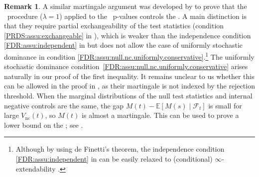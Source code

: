 \documentclass[a4paper,11pt]{article}
\theoremstyle{plain}
\theoremstyle{definition}
\newtheorem{remark}{Remark}
\def\EE{\mathbb{E}}
\def\calF{\mathcal{F}}
\theoremstyle{plain}
\newcommand{\No}{{n}}
\newcommand{\NoNc}{m}
\newcommand{\nickname}{{\text{RANC}}}
\newcommand{\ncFalsePositive}{{V_{\text{nc}}}}
\newcommand{\FDR}{\text{FDR}}
\newcommand{\BH}{{\text{BH}}}
\newcommand{\stoppingTime}{{\tau_q}}
\newcommand{\stoppingTimeSecond}{{\tau_{q,2}}}
\begin{document}
\begin{remark}
  A similar martingale argument was developed by
  \textcite{mary22_semi_super_multip_testin} to prove that the
  \BH~procedure ($\lambda = 1$) applied to the \nickname~p-values
  controls the \FDR. A main distinction is that they
  require partial exchangeability of the test statistics (condition
  \ref{PRDS:assu:exchangeable} in ), which is weaker
  than the independence condition \ref{FDR:assu:independent} in
   but does not allow
  the case of uniformly stochastic
  dominance in condition
  \ref{FDR:assu:null.nc.uniformly.conservative}.\footnote{Although by
    using de Finetti's theorem, the
    independence condition \ref{FDR:assu:independent} in
     can be easily relaxed to (conditional)
    $\infty$-extendability \parencite{diaconis1980finite}.}
  The uniformly stochastic dominance
  condition~\ref{FDR:assu:null.nc.uniformly.conservative} arises
  naturally in our proof of the first inequality. It remains unclear to us whether this
  can be allowed in the proof in
  \textcite{mary22_semi_super_multip_testin}, as their martingale is
  not indexed by the rejection threshold. When the marginal
  distributions of the null test statistics and internal negative controls are the same,
  the gap $M(t) - \EE\left[M(s) \mid \calF_t \right] $ is small for large
  $\ncFalsePositive(t)$, so $M(t)$ is almost a martingale. This can be
  used to prove a lower bound on the \FDR; see
  \textcite[thm.\ 3.1]{mary22_semi_super_multip_testin}.
\end{remark}

\end{document}
